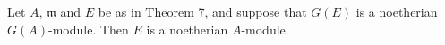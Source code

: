 Let $A$, $\mathfrak{m}$ and $E$ be as in Theorem 7, and suppose that $G(E)$ is a noetherian $G(A)$-module. Then $E$ is a noetherian $A$-module.